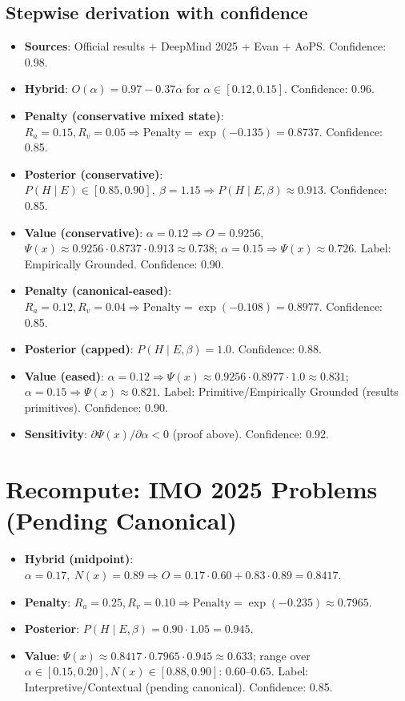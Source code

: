 \documentclass[11pt]{article}
\newcommand{\Nx}{N(x)}
\newcommand{\Px}{\Psi(x)}
\newcommand{\post}{P(H\mid E,\beta)}
\newcommand{\pen}{\mathrm{Penalty}}
\begin{document}
\subsection*{Stepwise derivation with confidence}
\begin{itemize}[leftmargin=1.2em]
  \item \textbf{Sources}: Official results + DeepMind 2025 + Evan + AoPS. Confidence: 0.98.
  \item \textbf{Hybrid}: $O(\alpha)=0.97-0.37\alpha$ for $\alpha\in[0.12,0.15]$. Confidence: 0.96.
  \item \textbf{Penalty (conservative mixed state)}: $R_a{=}0.15,R_v{=}0.05\Rightarrow \pen=\exp(-0.135)=0.8737$. Confidence: 0.85.
  \item \textbf{Posterior (conservative)}: $P(H\mid E)\in[0.85,0.90],\ \beta{=}1.15 \Rightarrow \post\approx 0.913$. Confidence: 0.85.
  \item \textbf{Value (conservative)}: $\alpha{=}0.12\Rightarrow O{=}0.9256$, $\Px\approx 0.9256\cdot 0.8737\cdot 0.913\approx \mathbf{0.738}$;
        $\alpha{=}0.15\Rightarrow \Px\approx 0.726$. Label: Empirically Grounded. Confidence: 0.90.
  \item \textbf{Penalty (canonical-eased)}: $R_a{=}0.12,R_v{=}0.04\Rightarrow \pen=\exp(-0.108)=0.8977$. Confidence: 0.85.
  \item \textbf{Posterior (capped)}: $\post=1.0$. Confidence: 0.88.
  \item \textbf{Value (eased)}: $\alpha{=}0.12\Rightarrow \Px\approx 0.9256\cdot 0.8977\cdot 1.0\approx \mathbf{0.831}$;
        $\alpha{=}0.15\Rightarrow \Px\approx \mathbf{0.821}$. Label: Primitive/Empirically Grounded (results primitives). Confidence: 0.90.
  \item \textbf{Sensitivity}: $\partial \Px/\partial \alpha<0$ (proof above). Confidence: 0.92.
\end{itemize}

\section{Recompute: IMO 2025 Problems (Pending Canonical)}
\begin{itemize}[leftmargin=1.2em]
  \item \textbf{Hybrid (midpoint)}: $\alpha{=}0.17,\ \Nx{=}0.89\Rightarrow O=0.17\cdot 0.60+0.83\cdot 0.89=0.8417$.
  \item \textbf{Penalty}: $R_a{=}0.25,R_v{=}0.10\Rightarrow \pen=\exp(-0.235)\approx 0.7965$.
  \item \textbf{Posterior}: $\post=0.90\cdot 1.05=0.945$.
  \item \textbf{Value}: $\Px\approx 0.8417\cdot 0.7965\cdot 0.945\approx \mathbf{0.633}$;
        range over $\alpha\in[0.15,0.20], \Nx\in[0.88,0.90]$: $\mathbf{0.60}$--$\mathbf{0.65}$.
        Label: Interpretive/Contextual (pending canonical). Confidence: 0.85.
\end{itemize}
\end{document}
